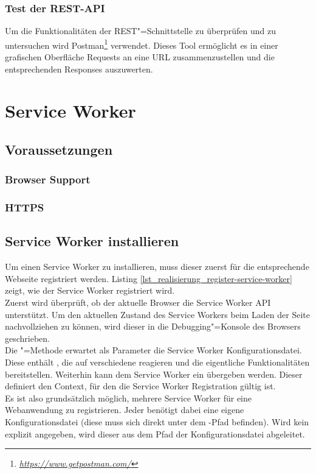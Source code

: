 \subsubsection{Test der REST-API}

Um die Funktionalitäten der REST"=Schnittstelle zu überprüfen und zu untersuchen wird Postman\footnote{\textit{\url{https://www.getpostman.com/}}} verwendet. Dieses Tool ermöglicht es in einer grafischen Oberfläche Requests an eine URL zusammenzustellen und die entsprechenden Responses auszuwerten.


\section{Service Worker}
\label{sec_realisierung_serviceworker}

\subsection{Voraussetzungen}

\subsubsection{Browser Support}

\subsubsection{HTTPS}


\subsection{Service Worker installieren}

Um einen Service Worker zu installieren, muss dieser zuerst für die entsprechende Webseite registriert werden. Listing \ref{lst_realisierung_register-service-worker} zeigt, wie der Service Worker registriert wird.\\
Zuerst wird überprüft, ob der aktuelle Browser die Service Worker API unterstützt. Um den aktuellen Zustand des Service Workers beim Laden der Seite nachvollziehen zu können, wird dieser in die Debugging"=Konsole des Browsers geschrieben.\\
Die "=Methode erwartet als Parameter die Service Worker Konfigurationsdatei. Diese enthält , die auf verschiedene  reagieren und die eigentliche Funktionalitäten bereitstellen. Weiterhin kann dem Service Worker ein  übergeben werden. Dieser definiert den Context, für den die Service Worker Registration gültig ist. \\
Es ist also grundsätzlich möglich, mehrere Service Worker für eine Webanwendung zu registrieren. Jeder  benötigt dabei eine eigene Konfigurationsdatei (diese muss sich direkt unter dem -Pfad befinden). Wird kein  explizit angegeben, wird dieser aus dem Pfad der Konfigurationsdatei abgeleitet.

